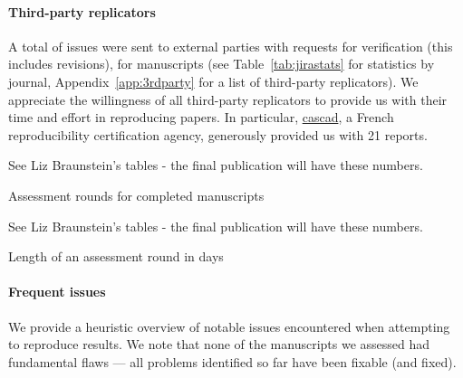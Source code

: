 \documentclass[PP]{AEA}
\begin{document}
\paragraph{Third-party replicators}

A total of \jiraexternal{} issues were sent to external parties with requests for verification (this includes revisions), for \jiramcsexternal{} manuscripts (see Table~\ref{tab:jirastats} for statistics by journal, Appendix~\ref{app:3rdparty} for a list of third-party replicators). We appreciate the willingness of all third-party replicators to provide us with their time and effort in reproducing papers. In particular, \href{https://cascad.tech}{cascad}, a French reproducibility certification agency, generously provided us with 21 reports.



\begin{table}
    \centering
    See Liz Braunstein's tables - the final publication will have these numbers.
    \caption{Assessment rounds for completed manuscripts}
    \label{tab:pre:rounds}
\end{table}

\begin{table}
    \centering
See Liz Braunstein's tables - the final publication will have these numbers.
    \caption{Length of an assessment round in days}
    \label{tab:pre:round_length}
\end{table}


\paragraph{Frequent issues}

We provide a heuristic overview of notable issues  encountered when attempting to reproduce results. We note that none of the \jiramcs{} manuscripts we assessed had  fundamental flaws --- all problems identified so far have been fixable (and fixed). 
\end{document}
